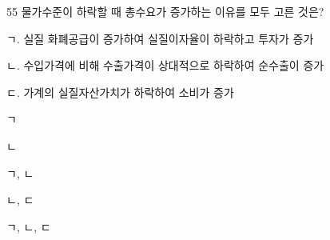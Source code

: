 \begin{question}{55}
물가수준이 하락할 때 총수요가 증가하는 이유를 모두 고른 것은?
\begin{framedtext}
ㄱ. 실질 화폐공급이 증가하여 실질이자율이 하락하고 투자가 증가 \par
ㄴ. 수입가격에 비해 수출가격이 상대적으로 하락하여 순수출이 증가 \par
ㄷ. 가계의 실질자산가치가 하락하여 소비가 증가 \par
\end{framedtext}
\begin{choices}
  \item ㄱ
  \item ㄴ
  \item ㄱ, ㄴ
  \item ㄴ, ㄷ
  \item ㄱ, ㄴ, ㄷ
\end{choices}
\end{question}
